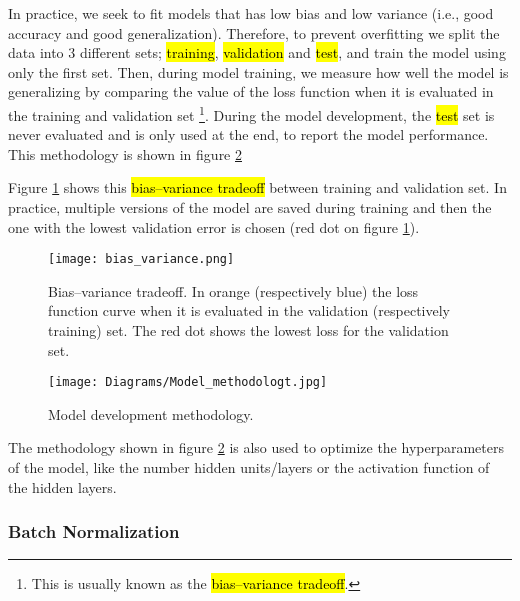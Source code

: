 In practice, we seek to fit models that has low bias and low variance (i.e., good accuracy and good generalization). Therefore, to prevent overfitting we split the data into 3 different sets; \hl{training}, \hl{validation} and \hl{test}, and train the model using only the first set. Then, during model training, we measure how well the model is generalizing by comparing the value of the loss function when it is evaluated in the training and validation set \footnote{This is usually known as the \hl{bias–variance tradeoff}.}.
During the model development, the \hl{test} set is never evaluated and is only used at the end, to report the model performance. This methodology is shown in figure \ref{fig:basics:model_train_process}

Figure \ref{fig:basics:bias_variance} shows this \hl{bias–variance tradeoff} between training and validation set. In practice, multiple versions of the model are saved during training and then the one with the lowest validation error is chosen (red dot on figure \ref{fig:basics:bias_variance}).

\begin{figure}[!ht]
  \centering
  \texttt{[image: bias\_variance.png]}
  \caption{Bias–variance tradeoff. In orange (respectively blue) the loss function curve when it is evaluated in the validation (respectively training) set. The red dot shows the lowest loss for the validation set.}
  \label{fig:basics:bias_variance}
\end{figure}

\begin{figure}[!ht]
  \centering
  \texttt{[image: Diagrams/Model\_methodologt.jpg]}
  \caption{Model development methodology.}
  \label{fig:basics:model_train_process}
\end{figure}

The methodology shown in figure \ref{fig:basics:model_train_process} is also used to optimize the hyperparameters of the model, like the number hidden units/layers or the activation function of the hidden layers.

\subsubsection{Batch Normalization}

